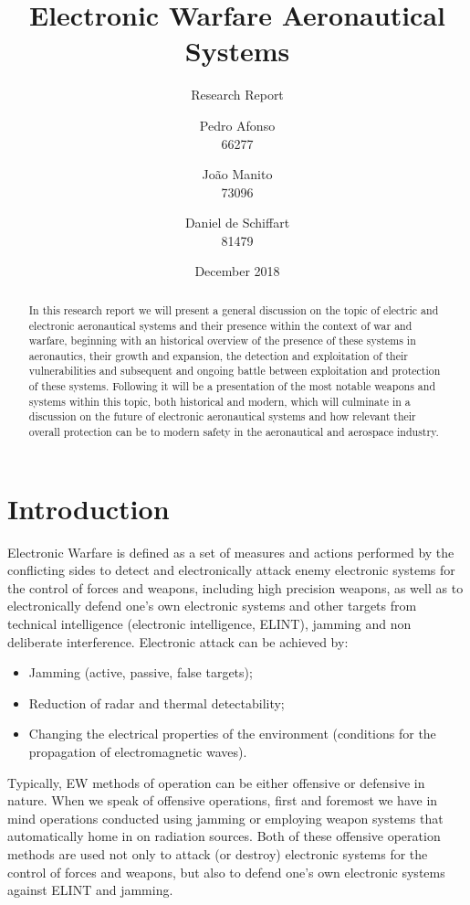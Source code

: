 \documentclass[palatino,english,purist]{ist-report}
\author{Pedro Afonso \\ 66277 \and João Manito \\ 73096 \and Daniel de Schiffart \\ 81479}
\title{Electronic Warfare Aeronautical Systems}
\subtitle{Research Report}
\date{December 2018}
\begin{document}
\makecover{}

\begin{abstract}
	In this research report we will present a general discussion on the topic of electric and electronic aeronautical systems and their presence within the context of war and warfare, beginning with an historical overview of the presence of these systems in aeronautics, their growth and expansion, the detection and exploitation of their vulnerabilities and subsequent and ongoing battle between exploitation and protection of these systems. Following it will be a presentation of the most notable weapons and systems within this topic, both historical and modern, which will culminate in a discussion on the future of electronic aeronautical systems and how relevant their overall protection  can be to modern safety in the aeronautical and aerospace industry.
\end{abstract}

{ \tableofcontents}

\pagebreak

\section{Introduction}\label{sec:introduction}
Electronic Warfare is defined as a set of measures and actions
performed by the conflicting sides to detect and electronically attack enemy electronic systems for the control of forces and weapons, including high precision weapons, as well as to electronically defend one's own electronic systems and other targets from technical intelligence (electronic intelligence, ELINT), jamming and non deliberate interference.  
Electronic attack can be achieved by:
\begin{itemize}
    \item Jamming (active, passive, false targets);
    \item Reduction of radar and thermal detectability;
    \item Changing the electrical properties of the environment (conditions
for the propagation of electromagnetic waves). 
\end{itemize}

Typically, EW methods of operation can be either offensive or
defensive in nature. When we speak of offensive operations, first and
foremost we have in mind operations conducted using jamming or employing weapon systems that automatically home in on radiation sources. Both of these offensive operation methods are used not only to attack (or destroy) electronic systems for the control of forces and weapons, but also to defend one's own electronic systems against ELINT and jamming.
\end{document}
